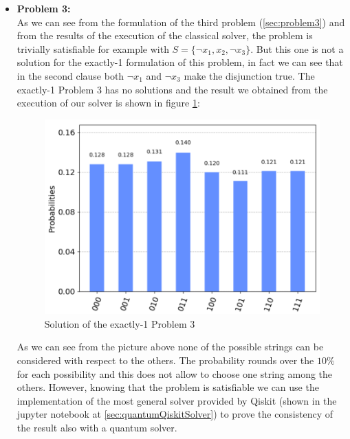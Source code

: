 \documentclass[english]{article}
\begin{document}
\begin{itemize}
					\item \textbf{Problem 3:} \\
						As we can see from the formulation of the third problem (\ref{sec:problem3}) and from the results of the execution of the classical solver, the problem is trivially satisfiable for example with $S = \{\neg x_1, x_2, \neg x_3\}$. But this one is not a solution for the exactly-1 formulation of this problem, in fact we can see that in the second clause both $\neg x_1$ and $\neg x_3$ make the disjunction true. The exactly-1 Problem 3 has no solutions and the result we obtained from the execution of our solver is shown in figure \ref{fig:problem3Solution}:
						\begin{figure}[h]
							\centering
							\includegraphics[scale=0.41]{Problem_3_Solution.png}
							\caption{
								\label{fig:problem3Solution}
								Solution of the exactly-1 Problem 3
							}
						\end{figure}
					
						As we can see from the picture above none of the possible strings can be considered with respect to the others. The probability rounds over the $10\%$ for each possibility and this does not allow to choose one string among the others. However, knowing that the problem is satisfiable we can use the implementation of the most general solver provided by Qiskit (shown in the jupyter notebook at \ref{sec:quantumQiskitSolver}) to prove the consistency of the result also with a quantum solver.
						

\end{itemize}
\end{document}
